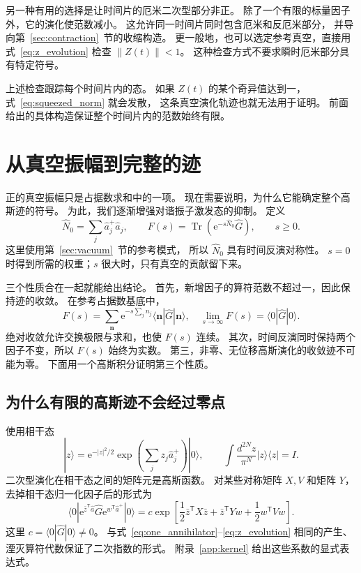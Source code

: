 \documentclass[UTF8,11pt,a4paper,fontset=fandol]{ctexart}
\newcommand{\Tr}{\operatorname{Tr}}
\newcommand{\ee}{\mathrm e}
\newcommand{\trans}{\mathsf T}
\newcommand{\bb}[1]{\bm{#1}}
\numberwithin{equation}{section}
\begin{document}
另一种有用的选择是让时间片的厄米二次型部分非正。
除了一个有限的标量因子外，它的演化使范数减小。
这允许同一时间片同时包含厄米和反厄米部分，
并导向第~\ref{sec:contraction}~节的收缩构造。
更一般地，也可以选定参考真空，直接用式~\eqref{eq:z_evolution}
检查 $\|Z(t)\|<1$。
这种检查方式不要求瞬时厄米部分具有特定符号。

上述检查跟踪每个时间片内的态。
如果 $Z(t)$ 的某个奇异值达到一，式~\eqref{eq:squeezed_norm} 就会发散，
这条真空演化轨迹也就无法用于证明。
前面给出的具体构造保证整个时间片内的范数始终有限。

\section{从真空振幅到完整的迹}
\label{sec:trace}

正的真空振幅只是占据数求和中的一项。
现在需要说明，为什么它能确定整个高斯迹的符号。
为此，我们逐渐增强对谐振子激发态的抑制。
定义
\begin{equation}
 \hat N_0=\sum_j\hat a_j^+\hat a_j,
 \qquad F(s)=\Tr\!\left(\ee^{-s\hat N_0}\hat G\right),
 \qquad s\geq0.
 \label{eq:thermal_filter}
\end{equation}
这里使用第~\ref{sec:vacuum}~节的参考模式，
所以 $\hat N_0$ 具有时间反演对称性。
$s=0$ 时得到所需的权重；$s$ 很大时，只有真空的贡献留下来。

三个性质合在一起就能给出结论。
首先，新增因子的算符范数不超过一，因此保持迹的收敛。
在参考占据数基底中，
\begin{equation}
 F(s)=\sum_{\bb n}\ee^{-s\sum_jn_j}
 \langle\bb n|\hat G|\bb n\rangle,
 \quad
 \lim_{s\to\infty}F(s)=\langle0|\hat G|0\rangle.
 \label{eq:filter_limit}
\end{equation}
绝对收敛允许交换极限与求和，也使 $F(s)$ 连续。
其次，时间反演同时保持两个因子不变，所以 $F(s)$ 始终为实数。
第三，非零、无位移高斯演化的收敛迹不可能为零。
下面用一个高斯积分证明第三个性质。

\subsection{为什么有限的高斯迹不会经过零点}

使用相干态
\begin{equation}
 |z\rangle=\ee^{-|z|^2/2}
 \exp\!\left(\sum_jz_j\hat a_j^+\right)|0\rangle,
 \qquad
 \int\frac{d^{2N}z}{\pi^N}|z\rangle\langle z|=I.
 \label{eq:coherent_states}
\end{equation}
二次型演化在相干态之间的矩阵元是高斯函数。
对某些对称矩阵 $X,V$ 和矩阵 $Y$，去掉相干态归一化因子后的形式为
\begin{equation}
 \langle0|\ee^{\bar z^\trans\hat a}\hat G
 \ee^{w^\trans\hat a^+}|0\rangle
 =c\exp\!\left[
 \frac12\bar z^\trans X\bar z+\bar z^\trans Yw
 +\frac12w^\trans Vw\right].
 \label{eq:gaussian_kernel}
\end{equation}
这里 $c=\langle0|\hat G|0\rangle\ne0$。
与式~\eqref{eq:one_annihilator}--\eqref{eq:z_evolution}
相同的产生、湮灭算符代数保证了二次指数的形式。
附录~\ref{app:kernel} 给出这些系数的显式表达式。
\end{document}
